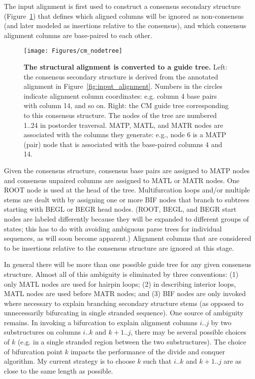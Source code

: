 \documentclass[11pt]{article}
\begin{document}
The input alignment is first used to construct a consensus secondary
structure (Figure~\ref{fig:cm_nodetree}) that defines which aligned
columns will be ignored as non-consensus (and later modeled as
insertions relative to the consensus), and which consensus alignment
columns are base-paired to each other.

\begin{figure}[t]
\begin{center}
\texttt{[image: Figures/cm\_nodetree]}
\end{center}
\caption{\textbf{The structural alignment is converted to a guide
tree.} Left: the consensus secondary structure is derived from the
annotated alignment in Figure~\ref{fig:input_alignment}. Numbers in
the circles indicate alignment column coordinates: e.g.  column 4 base
pairs with column 14, and so on. Right: the CM guide tree
corresponding to this consensus structure. The nodes of the tree are
numbered 1..24 in postorder traversal. MATP, MATL, and MATR nodes are
associated with the columns they generate: e.g., node 6 is a MATP
(pair) node that is associated with the base-paired columns 4 and 14.}
\label{fig:cm_nodetree}
\end{figure}

Given the consensus structure, consensus base pairs are assigned to
MATP nodes and consensus unpaired columns are assigned to MATL or MATR
nodes. One ROOT node is used at the head of the tree.  Multifurcation
loops and/or multiple stems are dealt with by assigning one or more
BIF nodes that branch to subtrees starting with BEGL or BEGR head
nodes. (ROOT, BEGL, and BEGR start nodes are labeled differently
because they will be expanded to different groups of states; this has
to do with avoiding ambiguous parse trees for individual sequences, as
will soon become apparent.) Alignment columns that are considered to
be insertions relative to the consensus structure are ignored at this
stage.

In general there will be more than one possible guide tree for any
given consensus structure. Almost all of this ambiguity is eliminated
by three conventions: (1) only MATL nodes are used for hairpin loops;
(2) in describing interior loops, MATL nodes are used before MATR
nodes; and (3) BIF nodes are only invoked where necessary to explain
branching secondary structure stems (as opposed to unnecessarily
bifurcating in single stranded sequence). One source of ambiguity
remains. In invoking a bifurcation to explain alignment columns $i..j$
by two substructures on columns $i..k$ and $k+1..j$, there may be
several possible choices of $k$ (e.g. in a single stranded region
between the two substructures). The choice of bifurcation point $k$
impacts the performance of the divide and conquer algorithm. My
current strategy is to choose $k$ such that $i..k$ and $k+1..j$ are as
close to the same length as possible.
\end{document}
